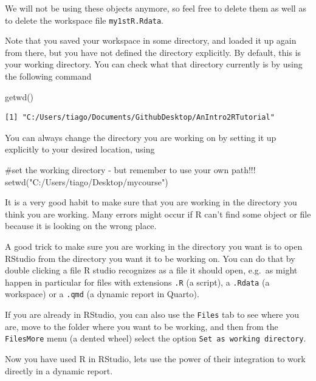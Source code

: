 \documentclass[
  letterpaper,
  DIV=11,
  numbers=noendperiod]{scrartcl}
\newenvironment{Shaded}{\begin{snugshade}}{\end{snugshade}}
\newcommand{\CommentTok}[1]{\textcolor[rgb]{0.37,0.37,0.37}{#1}}
\newcommand{\FunctionTok}[1]{\textcolor[rgb]{0.28,0.35,0.67}{#1}}
\newcommand{\NormalTok}[1]{\textcolor[rgb]{0.00,0.23,0.31}{#1}}
\newcommand{\StringTok}[1]{\textcolor[rgb]{0.13,0.47,0.30}{#1}}
\begin{document}
We will not be using these objects anymore, so feel free to delete them
as well as to delete the workspace file \texttt{my1stR.Rdata}.

Note that you saved your workspace in some directory, and loaded it up
again from there, but you have not defined the directory explicitly. By
default, this is your working directory. You can check what that
directory currently is by using the following command

\begin{Shaded}
\begin{Highlighting}[]
\FunctionTok{getwd}\NormalTok{()}
\end{Highlighting}
\end{Shaded}

\begin{verbatim}
[1] "C:/Users/tiago/Documents/GithubDesktop/AnIntro2RTutorial"
\end{verbatim}

You can always change the directory you are working on by setting it up
explicitly to your desired location, using

\begin{Shaded}
\begin{Highlighting}[]
\CommentTok{\#set the working directory {-} but remember to use your own path!!!}
\FunctionTok{setwd}\NormalTok{(}\StringTok{"C:/Users/tiago/Desktop/mycourse"}\NormalTok{)}
\end{Highlighting}
\end{Shaded}

It is a very good habit to make sure that you are working in the
directory you think you are working. Many errors might occur if R can't
find some object or file because it is looking on the wrong place.

A good trick to make sure you are working in the directory you want is
to open RStudio from the directory you want it to be working on. You can
do that by double clicking a file R studio recognizes as a file it
should open, e.g.~as might happen in particular for files with
extensions \texttt{.R} (a script), a \texttt{.Rdata} (a workspace) or a
\texttt{.qmd} (a dynamic report in Quarto).

If you are already in RStudio, you can also use the \texttt{Files} tab
to see where you are, move to the folder where you want to be working,
and then from the \texttt{Files\textbar{}More} menu (a dented wheel)
select the option \texttt{Set\ as\ working\ directory}.

Now you have used R in RStudio, lets use the power of their integration
to work directly in a dynamic report.
\end{document}
